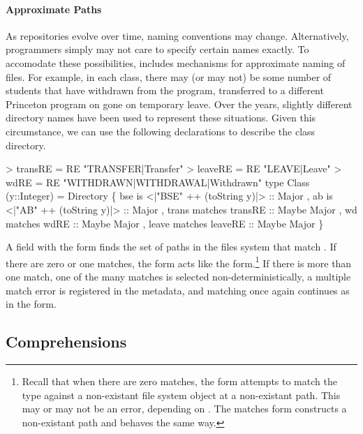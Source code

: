 \paragraph*{Approximate Paths}
As repositories evolve over time, naming conventions may change.
Alternatively, programmers simply may not care to specify certain names
exactly.  To accomodate these possibilities, \forest{} includes mechanisms
for approximate naming of files.  For example, in each class, there may
(or may not) be some number of students that have withdrawn from the
program, transferred to a different Princeton program on gone on
temporary leave.  Over the years, slightly different directory names
have been used to represent these situations.  Given this circumstance,
we can use the following declarations to describe the class directory.
\begin{code}
> transRE = RE "TRANSFER|Transfer"
> leaveRE = RE "LEAVE|Leave"
> wdRE    = RE "WITHDRAWN|WITHDRAWAL|Withdrawn"
\mbox{}
type Class (y::Integer) = Directory
  \{ bse is <|"BSE" ++ (toString y)|> :: Major
  , ab  is <|"AB"  ++ (toString y)|> :: Major   
  , trans matches transRE :: Maybe Major      
  , wd matches wdRE :: Maybe Major
  , leave matches leaveRE :: Maybe Major 
  \}
\end{code}
A field with the form 
finds the set of paths in the files system that match  .
If there are zero or one matches, the  form acts like the  
form.\footnote{Recall that when 
there are zero matches, the  form attempts to match the type  
against a non-existant file system object at a non-existant path.  This may or may not be
an error, depending on .  The matches form constructs a non-existant path
and behaves the same way.}  If there is more than one match, one of the many matches
is selected non-deterministically, a multiple match error is registered in the metadata,
and matching once again continues as in the  form.


\subsection{Comprehensions}
\label{sec:comprehensions}

